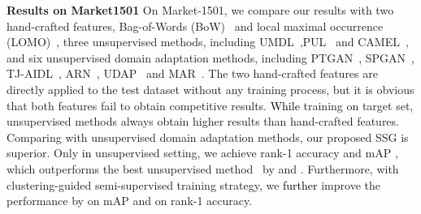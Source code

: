 \documentclass[10pt,twocolumn,letterpaper]{article}
\newcommand{\re}{\textcolor{black}}
\begin{document}
{\bf Results on Market1501}
On Market-1501, we compare our results with two hand-crafted features, \ie Bag-of-Words (BoW)~\cite{zheng2015scalable} and local maximal occurrence (LOMO)~\cite{liao2015person}, three unsupervised methods, including UMDL~\cite{peng2016unsupervised},PUL~\cite{fan2018unsupervised} and CAMEL~\cite{yu2017cross}, and six unsupervised domain adaptation methods, including PTGAN~\cite{wei2017person}, SPGAN~\cite{deng2018image}, TJ-AIDL~\cite{wang2018transferable}, ARN~\cite{li2018adaptation}, UDAP~\cite{song2018unsupervised} and MAR~\cite{yu2019unsupervised}. The two hand-crafted features are directly applied to the test dataset without any training process, but it is obvious that both features fail to obtain competitive results. \re{While} training on target set, unsupervised methods always obtain higher results than hand-crafted features. Comparing with unsupervised domain adaptation methods, our proposed SSG is superior. Only \re{in} unsupervised setting, we achieve rank-1 accuracy  and mAP , which outperforms the best unsupervised method~\cite{song2018unsupervised} by  and . Furthermore, with clustering-guided semi-supervised training strategy, we \re{further} improve the performance by  on mAP and  on rank-1 accuracy.
\end{document}
